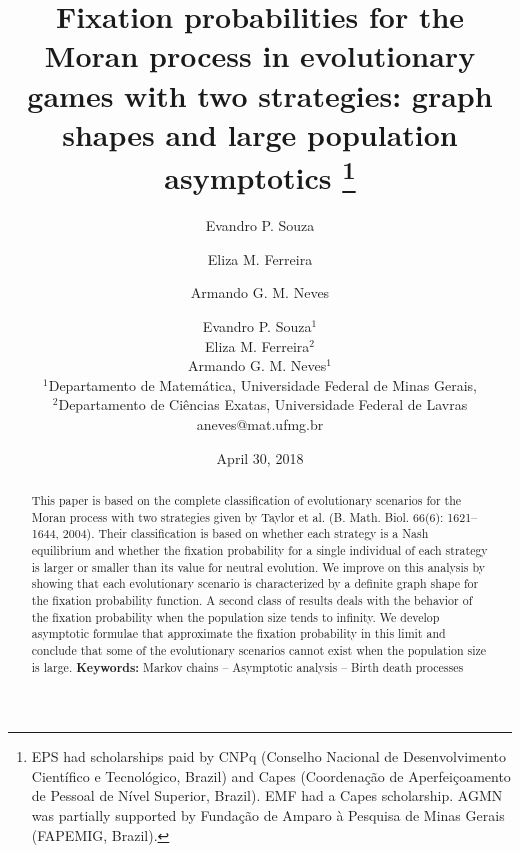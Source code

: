 \documentclass[12pt]{article}
\begin{document}
\title{Fixation probabilities for the Moran process in evolutionary games with two strategies: graph shapes and large population asymptotics
\thanks{EPS had scholarships paid by CNPq (Conselho Nacional de Desenvolvimento Cient\'ifico e Tecnol\'ogico, Brazil) and Capes (Coordena\c c\~ao de Aperfei\c coamento de Pessoal de N\'ivel Superior, Brazil). EMF had a Capes scholarship. AGMN was partially supported by Funda\c{c}\~ao de Amparo \`a Pesquisa de Minas Gerais (FAPEMIG, Brazil).}
}
\author{Evandro P. Souza \and Eliza M. Ferreira \and Armando G. M. Neves
}



\author
{Evandro P. Souza$^{1}$ \\ Eliza M. Ferreira$^{2}$ \\Armando G. M. Neves$^{1}$
	\\
	\normalsize{$^{1}$Departamento de Matem\'atica, Universidade Federal de Minas Gerais,}\\
	\normalsize{$^{2}$Departamento de Ci\^encias Exatas, Universidade Federal de Lavras}\\
	\normalsize{aneves@mat.ufmg.br}
}


\date{April 30, 2018}


\maketitle

\begin{abstract}
This paper is based on the complete classification of evolutionary scenarios for the Moran process with two strategies given by Taylor et al. (B. Math. Biol. 66(6): 1621--1644, 2004). Their classification is based on whether each strategy is a Nash equilibrium and whether the fixation probability for a single individual of each strategy is larger or smaller than its value for neutral evolution. We improve on this analysis by showing that each evolutionary scenario is characterized by a definite graph shape for the fixation probability function. A second class of results deals with the behavior of the fixation probability when the population size tends to infinity. We develop asymptotic formulae that approximate the fixation probability in this limit and conclude that some of the evolutionary scenarios cannot exist when the population size is large.
\textbf{Keywords:} Markov chains -- Asymptotic analysis -- Birth death processes
\end{abstract}
\end{document}
